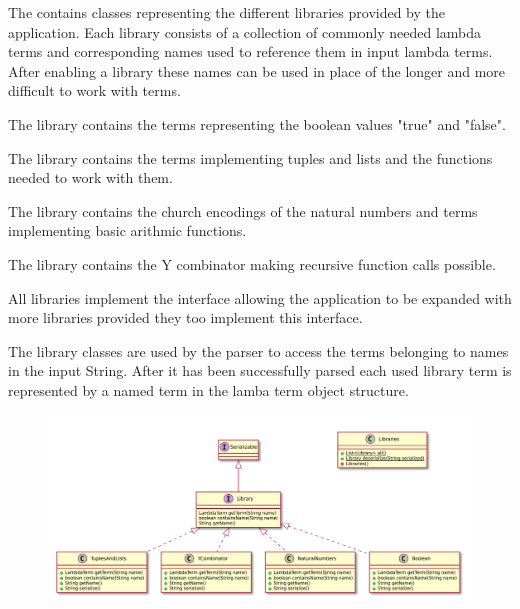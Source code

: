 The \texttt{} contains classes representing the different libraries provided by the application.
Each library consists of a collection of commonly needed lambda terms and corresponding names used to reference them in input lambda terms.
After enabling a library  these names can be used in place of the longer and more difficult to work with terms.

The \texttt{} library contains the terms representing the boolean values "true" and "false".

The \texttt{} library contains the terms implementing tuples and lists and the functions needed to work with them.

The \texttt{} library contains the church encodings of the natural numbers and terms implementing basic arithmic functions.

The \texttt{} library contains the Y combinator making recursive function calls possible.

All libraries implement the \texttt{} interface allowing the application to be expanded with more libraries provided they too implement this interface.

The library classes are used by the parser to access the terms belonging to names in the input String. 
After it has been successfully parsed each used library term is represented by a named term in the lamba term object structure.

\begin{figure}[H]
	\centering
	\includegraphics[width=\textwidth]{packageDiagrams/libraryPackage}
\end{figure}